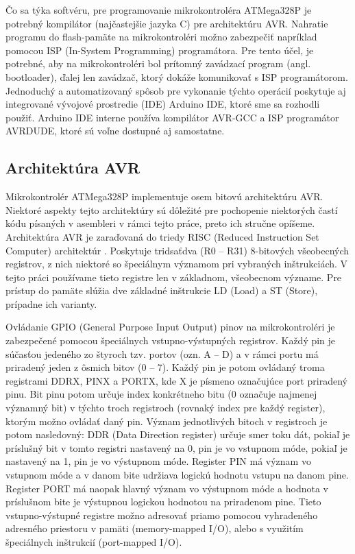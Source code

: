Čo sa týka softvéru, pre programovanie mikrokontroléra ATMega328P je potrebný kompilátor (najčastejšie jazyka C) pre architektúru AVR. Nahratie programu do flash-pamäte na mikrokontroléri možno zabezpečiť napríklad pomocou ISP (In-System Programming) programátora. Pre tento účel, je potrebné, aby na mikrokontroléri bol prítomný zavádzací program (angl. bootloader), ďalej len zavádzač, ktorý dokáže komunikovať s ISP programátorom. Jednoduchý a automatizovaný spôsob pre vykonanie týchto operácií poskytuje aj integrované vývojové prostredie (IDE) Arduino IDE, ktoré sme sa rozhodli použiť. Arduino IDE interne používa kompilátor AVR-GCC a ISP programátor AVRDUDE, ktoré sú voľne dostupné aj samostatne.

\subsection{Architektúra AVR}
Mikrokontrolér ATMega328P implementuje osem bitovú architektúru AVR. Niektoré aspekty tejto architektúry sú dôležité pre pochopenie niektorých častí kódu písaných v asembleri v rámci tejto práce, preto ich stručne opíšeme. Architektúra AVR je zaraďovaná do triedy RISC (Reduced Instruction Set Computer) architektúr \cite{avrInstruction}. Poskytuje tridsaťdva (R0 -- R31) 8-bitových všeobecných registrov, z nich niektoré so špeciálnym významom pri vybraných inštrukciách. V tejto práci používame tieto registre len v základnom, všeobecnom význame. Pre prístup do pamäte slúžia dve základné inštrukcie LD (Load) a ST (Store), prípadne ich varianty. 

Ovládanie GPIO (General Purpose Input Output) pinov na mikrokontroléri je zabezpečené pomocou špeciálnych vstupno-výstupných registrov. Každý pin je súčasťou jedeného zo štyroch tzv. portov (ozn. A -- D) a v rámci portu má priradený jeden z ôsmich bitov (0 -- 7). Každý pin je potom ovládaný troma registrami DDRX, PINX a PORTX, kde X je písmeno označujúce port priradený pinu. Bit pinu potom určuje index konkrétneho bitu (0 označuje najmenej významný bit) v týchto troch registroch (rovnaký index pre každý register), ktorým možno ovládať daný pin. Význam jednotlivých bitoch v registroch je potom nasledovný: DDR (Data Direction register) určuje smer toku dát, pokiaľ je príslušný bit v tomto registri nastavený na 0, pin je vo vstupnom móde, pokiaľ je nastavený na 1, pin je vo výstupnom móde. Register PIN má význam vo vstupnom móde a v danom bite udržiava logickú hodnotu vstupu na danom pine. Register PORT má naopak hlavný význam vo výstupnom móde a hodnota v príslušnom bite je výstupnou logickou hodnotou na priradenom pine. Tieto vstupno-výstupné registre možno adresovať priamo pomocou vyhradeného adresného priestoru v pamäti (memory-mapped I/O), alebo s využitím špeciálnych inštrukcií (port-mapped I/O).

